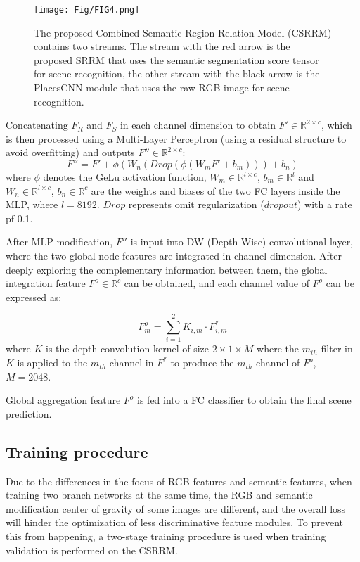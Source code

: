\documentclass[conference]{IEEEtran}
\begin{document}
\begin{figure}[htbp]
    \centering
    \texttt{[image: Fig/FIG4.png]}
    \caption{The proposed Combined Semantic Region Relation Model (CSRRM) contains two streams. The stream with the red arrow is the proposed SRRM that uses the semantic segmentation score tensor for scene recognition, the other stream with the black arrow is the PlacesCNN module that uses the raw RGB image for scene recognition.}
\label{Fig4}
\end{figure}

Concatenating $F_R$ and $F_S$ in each channel dimension to obtain $F' \in \mathbb{R}^{2 \times c}$, which is then processed using a Multi-Layer Perceptron (using a residual structure to avoid overfitting) and outputs $F'' \in \mathbb{R}^{2 \times c}$:
\begin{equation}
    F'' = F' + \phi ({W_n}(Drop(\phi ({W_m}F' + {b_m}))) + {b_n})
    \label{eq3}
\end{equation}
where $\phi$  denotes the GeLu activation function, $W_m \in \mathbb{R}^{l \times c}$, $b_m \in \mathbb{R}^l$ and $W_n \in \mathbb{R}^{l \times c}$, $b_n \in \mathbb{R}^{c}$ are the weights and biases of the two FC layers inside the MLP, where $l=8192$. $Drop$ represents omit regularization ($dropout$) with a rate pf 0.1.

After MLP modification, $F''$ is input into DW (Depth-Wise) convolutional layer, where the two global node features are integrated in channel dimension. After deeply exploring the complementary information between them, the global integration feature $F^o \in \mathbb{R}^c$ can be obtained, and each channel value of $F^o$ can be expressed as:

\begin{equation}
    F_{m}^{o}=\sum_{i=1}^{2}{K_{i,m}\cdot F_{i,m}^{''} }  
    \label{eq4}
\end{equation}
where $K$ is the depth convolution kernel of size $2 \times 1 \times M$ where the $m_{th}$ filter in $K$ is applied to the $m_{th}$ channel in $F^{''}$ to produce the $m_{th}$ channel of $F^o$, $M=2048$.

Global aggregation feature $F^o$ is fed into a FC classifier to obtain the final scene prediction.

\subsection{Training procedure}

Due to the differences in the focus of RGB features and semantic features, when training two branch networks at the same time, the RGB and semantic modification center of gravity of some images are different, and the overall loss will hinder the optimization of less discriminative feature modules. To prevent this from happening, a two-stage training procedure is used when training validation is performed on the CSRRM.
\end{document}

